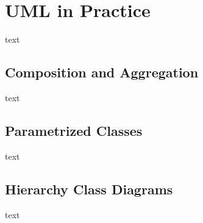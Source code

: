 \documentclass{article}
\begin{document}
\section{UML in Practice}
text

\subsection{Composition and Aggregation}
text

\subsection{Parametrized Classes}
text

\subsection{Hierarchy Class Diagrams}
text
\end{document}
